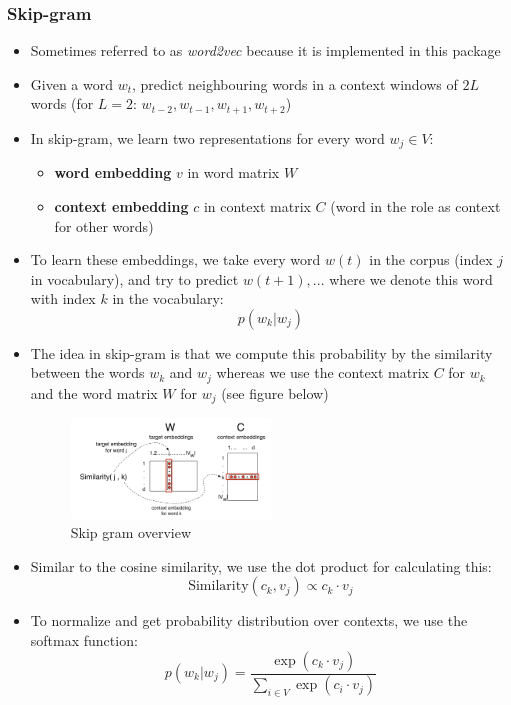 \subsubsection{Skip-gram}
\begin{itemize}
	\item Sometimes referred to as \textit{word2vec} because it is implemented in this package
	\item Given a word $w_t$, predict neighbouring words in a context windows of $2L$ words (for $L=2$: $w_{t-2}, w_{t-1}, w_{t+1}, w_{t+2}$) 
	\item In skip-gram, we learn two representations for every word $w_j \in V$:
	\begin{itemize}
		\item \textbf{word embedding} $v$ in word matrix $W$
		\item \textbf{context embedding} $c$ in context matrix $C$ (word in the role as context for other words)
	\end{itemize}
	\item To learn these embeddings, we take every word $w(t)$ in the corpus (index $j$ in vocabulary), and try to predict $w(t+1), ...$ where we denote this word with index $k$ in the vocabulary: 
	$$p\left(w_k | w_j\right)$$
	\item The idea in skip-gram is that we compute this probability by the similarity between the words $w_k$ and $w_j$ whereas we use the context matrix $C$ for $w_k$ and the word matrix $W$ for $w_j$ (see figure below)
	\begin{figure}[ht]
		\centering
		\includegraphics[width=0.5\textwidth]{figures/skip_gram_matrices.png}
		\caption{Skip gram overview}
		\label{fig:skip_gram_matrices}
	\end{figure}
	\item Similar to the cosine similarity, we use the dot product for calculating this:
	$$\text{Similarity}(c_k, v_j)\propto c_k\cdot v_j$$
	\item To normalize and get probability distribution over contexts, we use the softmax function:
	$$p\left(w_k|w_j\right)=\frac{\exp\left(c_k \cdot v_j\right)}{\sum_{i\in V} \exp\left(c_i \cdot v_j\right)}$$

\end{itemize}
